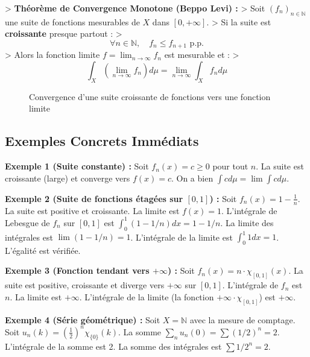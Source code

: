 \documentclass[11pt,a4paper]{article}
\begin{document}
> \textbf{Théorème de Convergence Monotone (Beppo Levi) :}
> Soit $(f_n)_{n \in \mathbb{N}}$ une suite de fonctions mesurables de $X$ dans $[0, +\infty]$.
> Si la suite est \textbf{croissante} presque partout :
> $$\forall n \in \mathbb{N}, \quad f_n \le f_{n+1} \text{ p.p.}$$
> Alors la fonction limite $f = \lim_{n \to \infty} f_n$ est mesurable et :
> $$\int_X \left( \lim_{n \to \infty} f_n \right) d\mu = \lim_{n \to \infty} \int_X f_n d\mu$$
\begin{figure}[h]
\centering
{}
\caption{Convergence d'une suite croissante de fonctions vers une fonction limite}
\end{figure}



\subsection{Exemples Concrets Immédiats}

\textbf{Exemple 1 (Suite constante) :}
Soit $f_n(x) = c \ge 0$ pour tout $n$. La suite est croissante (large) et converge vers $f(x) = c$. On a bien $\int c d\mu = \lim \int c d\mu$.

\textbf{Exemple 2 (Suite de fonctions étagées sur $[0,1]$) :}
Soit $f_n(x) = 1 - \frac{1}{n}$. La suite est positive et croissante.
La limite est $f(x) = 1$. L'intégrale de Lebesgue de $f_n$ sur $[0,1]$ est $\int_0^1 (1 - 1/n) dx = 1 - 1/n$.
La limite des intégrales est $\lim (1 - 1/n) = 1$. L'intégrale de la limite est $\int_0^1 1 dx = 1$. L'égalité est vérifiée.

\textbf{Exemple 3 (Fonction tendant vers $+\infty$) :}
Soit $f_n(x) = n \cdot \chi_{[0,1]}(x)$. La suite est positive, croissante et diverge vers $+\infty$ sur $[0,1]$.
L'intégrale de $f_n$ est $n$. La limite est $+\infty$. L'intégrale de la limite (la fonction $+\infty \cdot \chi_{[0,1]}$) est $+\infty$.

\textbf{Exemple 4 (Série géométrique) :}
Soit $X = \mathbb{N}$ avec la mesure de comptage. Soit $u_n(k) = (\frac{1}{2})^n \chi_{\{0\}}(k)$.
La somme $\sum_n u_n(0) = \sum (1/2)^n = 2$.
L'intégrale de la somme est 2. La somme des intégrales est $\sum 1/2^n = 2$.
\end{document}
